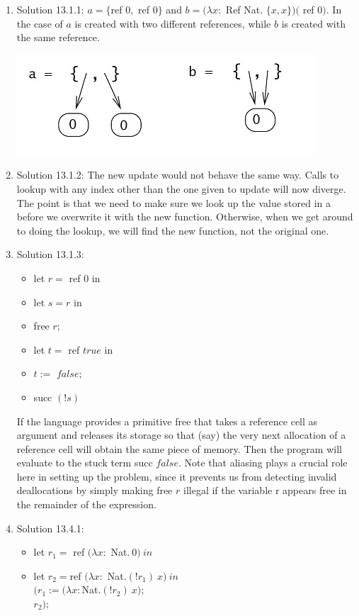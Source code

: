 \documentclass [proof]{article}
\begin{document}
\begin{enumerate}
    \item Solution 13.1.1: $a = \{$\textsf ref $0, $ \textsf ref $0 \}$  and $b = (\lambda x: $ \textsf {Ref Nat}. $\{x, x\}) ($ \textsf ref $0)$. In the case of $a$ is created with two different references, while $b$ is created with the same reference.
     \begin{center} \includegraphics{fig1.jpg} \end{center}
  	\item Solution 13.1.2: The  new update would not behave the same way. Calls to lookup with any index other than the one given to \textsf update will now diverge. The point is that we need to make sure we look up the value stored in a before we overwrite it with the new function. Otherwise, when we get around to doing the lookup, we will find the new function, not the original one.
    \item Solution 13.1.3:
    \begin{itemize}
    	\item \textsf let $r =$ \textsf ref $0$ \text in
		\item \textsf let $s = r $ \text in
		\item \textsf free $r;$
		\item \textsf let $t =$ \textsf {ref} $true$ \text in
		\item $t :=$  $false;$
		\item \textsf succ $(!s)$
	\end{itemize}
		If the language provides a primitive \textsf free that takes a reference cell as argument and releases its storage so that (say) the very next allocation of a reference cell will obtain the same piece of memory. Then the program will evaluate to the stuck term \textsf succ $false$. Note that aliasing plays a crucial role here in setting up the problem, since it prevents us from detecting invalid deallocations by simply making free $r$ illegal if the variable r appears free in the remainder of the expression.
\item Solution 13.4.1:
	\begin{itemize}
	\item \textsf let $r_1 = $ \textsf ref $(\lambda x:$ \textsf Nat$. \ 0)\ in$
	\item \textsf let $r_2 = $\textsf ref $(\lambda x:$ \textsf Nat$.(!r_1)\ x) \ in$\\
    $(r_1 := (\lambda x:$\textsf Nat$.(!r_2)\ x);$\\
    $r_2);$
	\end{itemize}
	


\end{enumerate}
\end{document}
